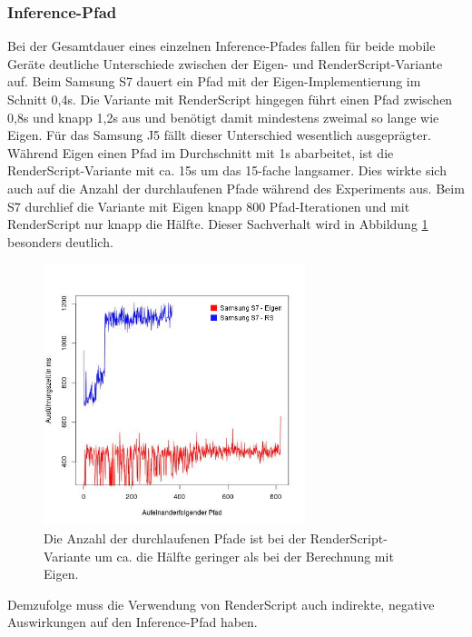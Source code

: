 \subsubsection{Inference-Pfad}
\label{subsubsec:inferencepfad}
Bei der Gesamtdauer eines einzelnen Inference-Pfades fallen für beide mobile Geräte deutliche Unterschiede zwischen der Eigen- und RenderScript-Variante auf. Beim Samsung S7 dauert ein Pfad mit der Eigen-Implementierung im Schnitt 0,4s. Die Variante mit RenderScript hingegen führt einen Pfad zwischen 0,8s und knapp 1,2s aus und benötigt damit mindestens zweimal so lange wie Eigen. Für das Samsung J5 fällt dieser Unterschied wesentlich ausgeprägter. Während Eigen einen Pfad im Durchschnitt mit 1s abarbeitet, ist die RenderScript-Variante mit ca. 15s um das 15-fache langsamer. Dies wirkte sich auch auf die Anzahl der durchlaufenen Pfade während des Experiments aus. Beim S7 durchlief die Variante mit Eigen knapp 800 Pfad-Iterationen und mit RenderScript nur knapp die Hälfte. Dieser Sachverhalt wird in Abbildung \ref{fig:s7pfade} besonders deutlich. 
\begin{figure}[!t]
	\centering
	\includegraphics[width=3.0in]{images/s7ADB-eigen-rs-path-legende.jpg}
	\caption{Die Anzahl der durchlaufenen Pfade ist bei der RenderScript-Variante um ca. die Hälfte geringer als bei der Berechnung mit Eigen. }
	\label{fig:s7pfade}
\end{figure}
Demzufolge muss die Verwendung von RenderScript auch indirekte, negative Auswirkungen auf den Inference-Pfad haben. 

